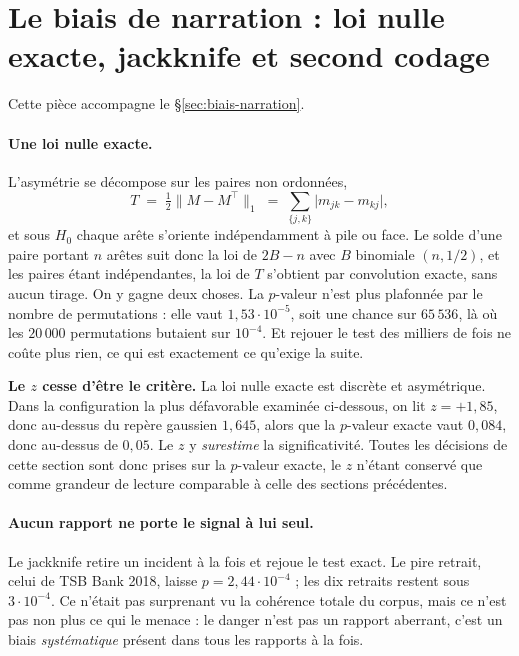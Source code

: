 \section{Le biais de narration : loi nulle exacte, jackknife et second codage}
\label{sec:ann-biais-narration}


Cette pièce accompagne le \S\ref{sec:biais-narration}.

\paragraph{Une loi nulle exacte.} L'asymétrie se
décompose sur les paires non ordonnées,
\[
  T \;=\; \tfrac12\lVert M - M^\top\rVert_1
    \;=\; \sum_{\{j,k\}} \bigl| m_{jk} - m_{kj} \bigr|,
\]
et sous $H_0$ chaque arête s'oriente indépendamment à pile ou face. Le solde d'une paire portant
$n$ arêtes suit donc la loi de $2B-n$ avec $B$ binomiale $(n,1/2)$, et les paires étant
indépendantes, la loi de $T$ s'obtient par convolution exacte, sans aucun tirage. On y
gagne deux choses. La $p$-valeur n'est plus plafonnée par le nombre de permutations : elle vaut
$1{,}53\cdot10^{-5}$, soit une chance sur $65\,536$, là où les $20\,000$ permutations butaient
sur $10^{-4}$. Et rejouer le test des milliers de fois ne coûte plus rien, ce qui est
exactement ce qu'exige la suite.

\begin{attention}
\textbf{Le $z$ cesse d'être le critère.} La loi nulle exacte est discrète et asymétrique. Dans
la configuration la plus défavorable examinée ci-dessous, on lit $z=+1{,}85$, donc au-dessus du
repère gaussien $1{,}645$, alors que la $p$-valeur exacte vaut $0{,}084$, donc au-dessus de
$0{,}05$. Le $z$ y \emph{surestime} la significativité. Toutes les décisions de cette section
sont donc prises sur la $p$-valeur exacte, le $z$ n'étant conservé que comme grandeur de
lecture comparable à celle des sections précédentes.
\end{attention}

\paragraph{Aucun rapport ne porte le signal à lui seul.} Le jackknife retire un incident à la
fois et rejoue le test exact. Le pire retrait, celui de TSB Bank 2018, laisse
$p = 2{,}44\cdot10^{-4}$ ; les dix retraits restent sous $3\cdot10^{-4}$. Ce n'était pas
surprenant vu la cohérence totale du corpus, mais ce n'est pas non plus ce qui le menace : le
danger n'est pas un rapport aberrant, c'est un biais \emph{systématique} présent dans tous les
rapports à la fois.


